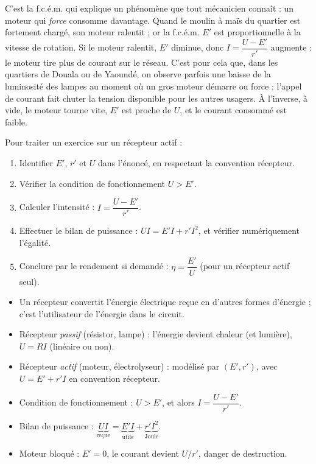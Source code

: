 \documentclass[11pt]{article}
\begin{document}
\begin{savaistu}
C'est la f.c.é.m. qui explique un phénomène que tout mécanicien connaît : un moteur qui \emph{force} consomme davantage. Quand le moulin à maïs du quartier est fortement chargé, son moteur ralentit ; or la f.c.é.m. $E'$ est proportionnelle à la vitesse de rotation. Si le moteur ralentit, $E'$ diminue, donc $I = \dfrac{U - E'}{r'}$ augmente : le moteur tire plus de courant sur le réseau. C'est pour cela que, dans les quartiers de Douala ou de Yaoundé, on observe parfois une baisse de la luminosité des lampes au moment où un gros moteur démarre ou force : l'appel de courant fait chuter la tension disponible pour les autres usagers. À l'inverse, à vide, le moteur tourne vite, $E'$ est proche de $U$, et le courant consommé est faible.
\end{savaistu}

\begin{methode}[Exploiter la relation $U = E' + r'I$]
Pour traiter un exercice sur un récepteur actif :
\begin{enumerate}
\item Identifier $E'$, $r'$ et $U$ dans l'énoncé, en respectant la convention récepteur.
\item Vérifier la condition de fonctionnement $U > E'$.
\item Calculer l'intensité : $I = \dfrac{U - E'}{r'}$.
\item Effectuer le bilan de puissance : $UI = E'I + r'I^2$, et vérifier numériquement l'égalité.
\item Conclure par le rendement si demandé : $\eta = \dfrac{E'}{U}$ (pour un récepteur actif seul).
\end{enumerate}
\end{methode}

\begin{aretenir}
\begin{itemize}
\item Un récepteur convertit l'énergie électrique reçue en d'autres formes d'énergie ; c'est l'utilisateur de l'énergie dans le circuit.
\item Récepteur \emph{passif} (résistor, lampe) : l'énergie devient chaleur (et lumière), $U = RI$ (linéaire ou non).
\item Récepteur \emph{actif} (moteur, électrolyseur) : modélisé par $(E', r')$, avec $U = E' + r'I$ en convention récepteur.
\item Condition de fonctionnement : $U > E'$, et alors $I = \dfrac{U - E'}{r'}$.
\item Bilan de puissance : $\underbrace{UI}_{\text{reçue}} = \underbrace{E'I}_{\text{utile}} + \underbrace{r'I^2}_{\text{Joule}}$.
\item Moteur bloqué : $E' = 0$, le courant devient $U/r'$, danger de destruction.
\end{itemize}
\end{aretenir}
\end{document}
